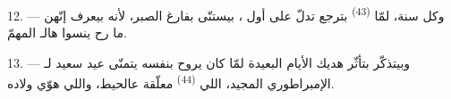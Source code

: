 12. --- وكل سنة، لمّا  \textsuperscript{(43)} بترجع
تدلّ على  أول ، بيستنّى
 بفارغ الصبر، لأنه بيعرف إنّهن ما رح ينسوا هالـ
المهمّ.

13. --- وبيتذكّر بتأثّر هديك الأيام البعيدة لمّا كان يروح بنفسه يتمنّى
عيد سعيد لـ الإمبراطوري المجيد، اللي 
\textsuperscript{(44)} معلّقة عالحيط، واللي هوّي 
ولاده.

\VUsaut{6.0mm}
\VUfilet{22mm}
